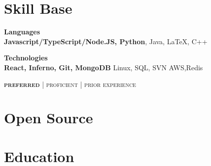 \documentclass{article}
\begin{document}
\begin{minipage}[t]{0.38\textwidth}
  \vspace{0pt}

  \section{Skill Base}
  {\raggedright
    \textbf{Languages} \\
    {\small
      {\color{highlight}
        \textbf{Javascript/TypeScript/Node.JS, Python}, Java,
      }
      LaTeX, C++
    }

    \vspace{5pt}

    \textbf{Technologies} \\
    {\small
      {\color{highlight}
        \textbf{React, Inferno, Git, MongoDB}
      }
      {\color{highlight}
        Linux, SQL, SVN
      }
      AWS,Redis
    }

    \hfill\textsc{\footnotesize{{\color{highlight} \textbf{preferred}} | {\color{highlight} proficient} | prior experience}}
  }

  \section{Open Source}

    

    

    

  \section{Education}

    

    
\end{minipage}
\end{document}

